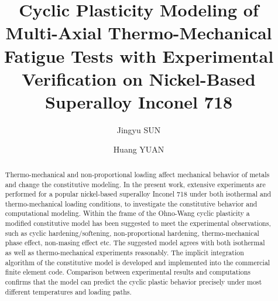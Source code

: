 \documentclass[preprint,5p,twocolumn,11pt,sort&compress]{elsarticle}
\begin{document}

\begin{frontmatter}



\title{Cyclic Plasticity Modeling of Multi-Axial Thermo-Mechanical Fatigue Tests with Experimental Verification on  Nickel-Based Superalloy Inconel 718}


\author{Jingyu SUN}
\author{Huang YUAN}

\address[label1]{School of Aerospace Engineering, Tsinghua University, Beijing, China}

\begin{abstract}
Thermo-mechanical  and non-proportional loading affect mechanical behavior of metals and change the constitutive modeling. In the present work, extensive experiments are performed for a popular nickel-based superalloy Inconel 718 under both isothermal and thermo-mechanical loading conditions, to investigate the constitutive behavior and computational modeling. Within the frame of the Ohno-Wang cyclic plasticity  a modified constitutive model has been suggested to meet the experimental observations, such as cyclic hardening/softening, non-proportional hardening, thermo-mechanical phase effect, non-masing effect etc. The suggested model agrees with both isothermal as well as thermo-mechanical experiments reasonably. The implicit integration algorithm of the constitutive model is developed and implemented into the commercial finite element code. Comparison between  experimental results and computations confirms that the model can predict the cyclic plastic behavior precisely under most different temperatures and loading paths.
\end{abstract}


\end{frontmatter}
\end{document}
